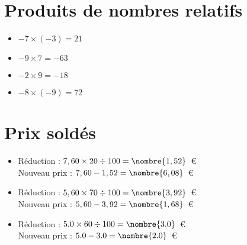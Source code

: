 \documentclass[a4paper,11pt,fleqn]{article}
\begin{document}
\section{Produits de nombres relatifs}
\begin{itemize}

  \item $-7\times(-3)=21$
  \item $-9\times7=-63$
  \item $-2\times9=-18$
  \item $-8\times(-9)=72$
\end{itemize}

\section{Prix soldés}
\begin{itemize}

  \item Réduction : $7,60\times20\div100=\nombre{1,52}$~€\\
  Nouveau prix : $7,60-1,52=\nombre{6,08}$~€
  \item Réduction : $5,60\times70\div100=\nombre{3,92}$~€\\
  Nouveau prix : $5,60-3,92=\nombre{1,68}$~€
  \item Réduction : $5.0\times60\div100=\nombre{3.0}$~€\\
  Nouveau prix : $5.0-3.0=\nombre{2.0}$~€
\end{itemize}
\end{document}
